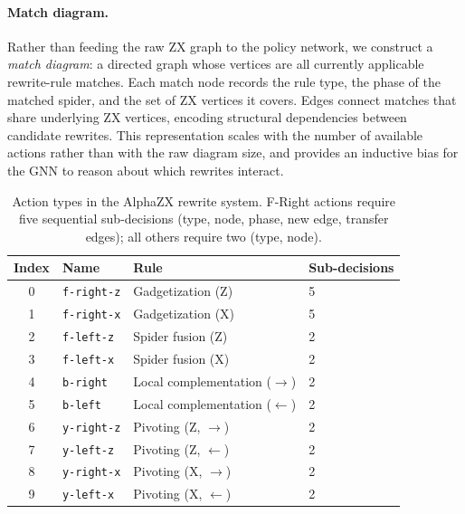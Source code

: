\documentclass[11pt,a4paper]{article}
\begin{document}
\paragraph{Match diagram.}
Rather than feeding the raw ZX graph to the policy network, we construct
a \emph{match diagram}: a directed graph whose vertices are all currently
applicable rewrite-rule matches.  Each match node records the rule type,
the phase of the matched spider, and the set of ZX vertices it covers.
Edges connect matches that share underlying ZX vertices, encoding
structural dependencies between candidate rewrites.  This representation
scales with the number of available actions rather than with the raw
diagram size, and provides an inductive bias for the GNN to reason about
which rewrites interact.

\begin{table}[t]
\centering
\caption{Action types in the AlphaZX rewrite system.  F-Right actions
require five sequential sub-decisions (type, node, phase, new edge,
transfer edges); all others require two (type, node).}
\label{tab:action_types}
\small
\begin{tabular}{clll}
\toprule
Index & Name & Rule & Sub-decisions \\
\midrule
0 & \texttt{f-right-z} & Gadgetization (Z) & 5 \\
1 & \texttt{f-right-x} & Gadgetization (X) & 5 \\
2 & \texttt{f-left-z}  & Spider fusion (Z) & 2 \\
3 & \texttt{f-left-x}  & Spider fusion (X) & 2 \\
4 & \texttt{b-right}   & Local complementation ($\to$) & 2 \\
5 & \texttt{b-left}    & Local complementation ($\leftarrow$) & 2 \\
6 & \texttt{y-right-z} & Pivoting (Z, $\to$) & 2 \\
7 & \texttt{y-left-z}  & Pivoting (Z, $\leftarrow$) & 2 \\
8 & \texttt{y-right-x} & Pivoting (X, $\to$) & 2 \\
9 & \texttt{y-left-x}  & Pivoting (X, $\leftarrow$) & 2 \\
\bottomrule
\end{tabular}
\end{table}
\end{document}
